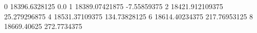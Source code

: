 0 18396.6328125 0.0
1 18389.07421875 -7.55859375
2 18421.912109375 25.279296875
4 18531.37109375 134.73828125
6 18614.40234375 217.76953125
8 18669.40625 272.7734375
